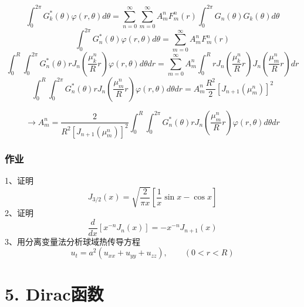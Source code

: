 \begin{frame}
	\begin{equation*}
		 \int_0 ^{2\pi} G_k ^* (\theta) \varphi(r, \theta) d\theta =\sum_{n=0}^{\infty} \sum_{m=0}^{\infty} A_m ^n F_m ^n (r) \int_0 ^{2\pi} G_n(\theta) G_k(\theta) d\theta
	\end{equation*}
	\begin{equation*}
		 \int_0 ^{2\pi} G_n  ^* (\theta) \varphi(r, \theta) d\theta = \sum_{m=0}^{\infty} A_m ^n F_m ^n (r)
	\end{equation*}
	{\small \begin{equation*}
		\int_0 ^{R} \int_0 ^{2\pi} G_n ^* (\theta) r J_n (\frac{\mu_{k}^{n}}{R}r) \varphi(r, \theta) d\theta dr = \sum_{m=0}^{\infty} A_m ^n \int_0 ^{R} r J_n (\frac{\mu_{k}^{n}}{R}r)J_n (\frac{\mu_{m}^{n}}{R}r) dr
	\end{equation*}}
	\begin{equation*}
		\int_0 ^{R} \int_0 ^{2\pi} G_n ^* (\theta) r J_n (\frac{\mu_{m}^{n}}{R}r) \varphi(r, \theta) d\theta dr = A_m ^n \frac{R^2}{2} [J_{n+1}(\mu_m ^n)]^2
	\end{equation*}
\end{frame}	

\begin{frame}
	\begin{equation*}
		\to A_m ^n=	\frac{2}{R^2[J_{n+1}(\mu_m ^n)]^2} \int_0 ^{R} \int_0 ^{2\pi} G_n ^* (\theta) r J_n (\frac{\mu_{m}^{n}}{R}r) \varphi(r, \theta) d\theta dr 
	\end{equation*}
\end{frame}

\begin{frame}
	\frametitle{作业}
	1、证明 
	\begin{equation*}
		J_{3/2}(x)=\sqrt{\frac{2}{\pi x}} [\frac{1}{x}\sin x -\cos x]
	\end{equation*}
	2、证明
	\begin{equation*}
		\frac{d}{d x}\left[x^{-n} J_{n}(x)\right]=-x^{-n} J_{n+1}(x) 
	\end{equation*}	
	3、用分离变量法分析球域热传导方程
	\begin{equation*}
		u_t=a^2 (u_{xx}+u_{yy}+u_{zz}), \qquad (0<r<R)
	\end{equation*}	
\end{frame}	

\section{5. Dirac函数}
